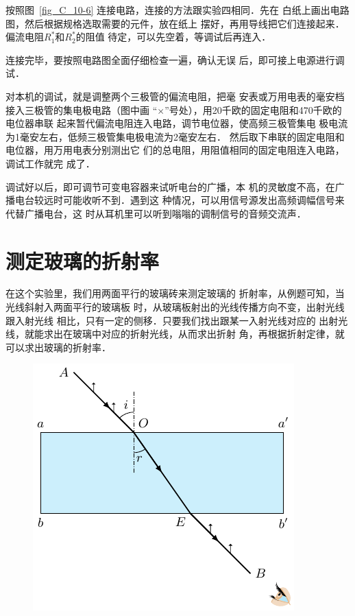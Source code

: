 按照图~\ref{fig_C_10-6} 连接电路，连接的方法跟实验四相同．先在
白纸上画出电路图，然后根据规格选取需要的元件，放在纸上
摆好，再用导线把它们连接起来．偏流电阻$R_1^*$和$R_2^*$的阻值
待定，可以先空着，等调试后再连入．

连接完毕，要按照电路图全面仔细检查一遍，确认无误
后，即可接上电源进行调试．

对本机的调试，就是调整两个三极管的偏流电阻，把毫
安表或万用电表的毫安档接入三极管的集电极电路（图中画
“$\times$”号处），用20千欧的固定电阻和470千欧的电位器串联
起来暂代偏流电阻连入电路，调节电位器，使高频三极管集电
极电流为1毫安左右，低频三极管集电极电流为2毫安左右．
然后取下串联的固定电阻和电位器，用万用电表分别测出它
们的总电阻，用阻值相同的固定电阻连入电路，调试工作就完
成了．

调试好以后，即可调节可变电容器来试听电台的广播，本
机的灵敏度不高，在广播电台较远时可能收听不到．遇到这
种情况，可以用信号源发出高频调幅信号来代替广播电台，这
时从耳机里可以听到嗡嗡的调制信号的音频交流声．

\section{测定玻璃的折射率}

在这个实验里，我们用两面平行的玻璃砖来测定玻璃的
折射率，从例题可知，当光线斜射入两面平行的玻璃板
时，从玻璃板射出的光线传播方向不变，出射光线跟入射光线
相比，只有一定的侧移．只要我们找出跟某一入射光线对应的
出射光线，就能求出在玻璃中对应的折射光线，从而求出折射
角，再根据折射定律，就可以求出玻璃的折射率．
\begin{figure}[htbp]
    \centering
    \includegraphics{fig/C/10-7.pdf}
    \caption{}\label{fig_C_10-7}
\end{figure}

